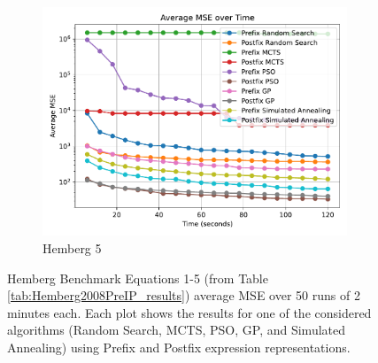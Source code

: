 \documentclass[runningheads]{llncs}
\begin{document}
\begin{figure}
    \vspace{0.4cm}
    \begin{subfigure}[b]{0.4\textwidth}
        \includegraphics[width=\linewidth, keepaspectratio]{Hemberg_Benchmarks/Hemberg_Benchmark_5.pdf}
        \caption{Hemberg 5}
        \label{subfig:hemberg_5}
    \end{subfigure}
    
    \caption{Hemberg Benchmark Equations 1-5 (from Table \ref{tab:Hemberg2008PreIP_results}) average MSE over 50 runs of 2 minutes each. Each plot shows the results for one of the considered algorithms (Random Search, MCTS, PSO, GP, and Simulated Annealing) using Prefix and Postfix expression representations.}
    \label{fig:Hemberg_Benchmarks}
\end{figure}


    
    
    
\end{document}
